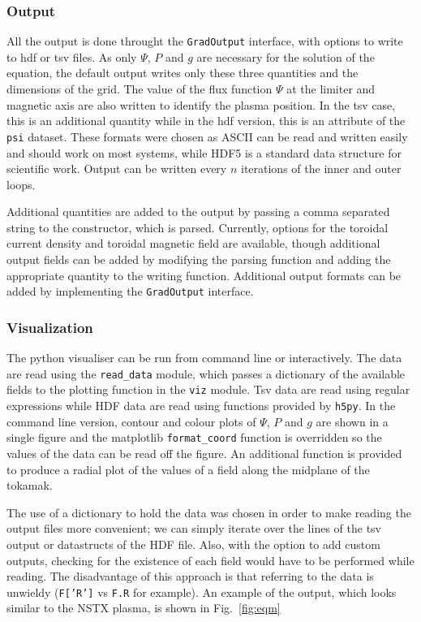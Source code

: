 \documentclass[paper=letter, fontsize=11pt]{scrartcl} %
\begin{document}
\subsubsection{Output}
All the output is done throught the \texttt{GradOutput} interface, with options to write to hdf or tsv files. As only $\Psi$, $P$ and $g$ are necessary for the solution of the equation, the default output writes only these three quantities and the dimensions of the grid. The value of the flux function $\Psi$ at the limiter and magnetic axis are also written to identify the plasma position. In the tsv case, this is an additional quantity while in the hdf version, this is an attribute of the \texttt{psi} dataset. These formats were chosen as ASCII can be read and written easily and should work on most systems, while HDF5 is a standard data structure for scientific work. Output can be written every $n$ iterations of the inner and outer loops. 

Additional quantities are added to the output by passing a comma separated string to the constructor, which is parsed. Currently, options for the toroidal current density and toroidal magnetic field are available, though additional output fields can be added by modifying the parsing function and adding the appropriate quantity to the writing function. Additional output formats can be added by implementing the \texttt{GradOutput} interface.

\subsubsection{Visualization}

The python visualiser can be run from command line or interactively. The data are read using the \texttt{read\_data} module, which passes a dictionary of the available fields to the plotting function in the \texttt{viz} module. Tsv data are read using regular expressions while HDF data are read using functions provided by \texttt{h5py}. In the command line version, contour and colour plots of $\Psi$, $P$ and $g$ are shown in a single figure and the matplotlib \texttt{format\_coord} function is overridden so the values of the data can be read off the figure. An additional function is provided to produce a radial plot of the values of a field along the midplane of the tokamak. 

The use of a dictionary to hold the data was chosen in order to make reading the output files more convenient; we can simply iterate over the lines of the tsv output or datastructs of the HDF file. Also, with the option to add custom outputs, checking for the existence of each field would have to be performed while reading. The disadvantage of this approach is that referring to the data is unwieldy (\texttt{F['R']} vs \texttt{F.R} for example). An example of the output, which looks similar to the NSTX plasma, is shown in Fig.~\ref{fig:eqm}
\end{document}
